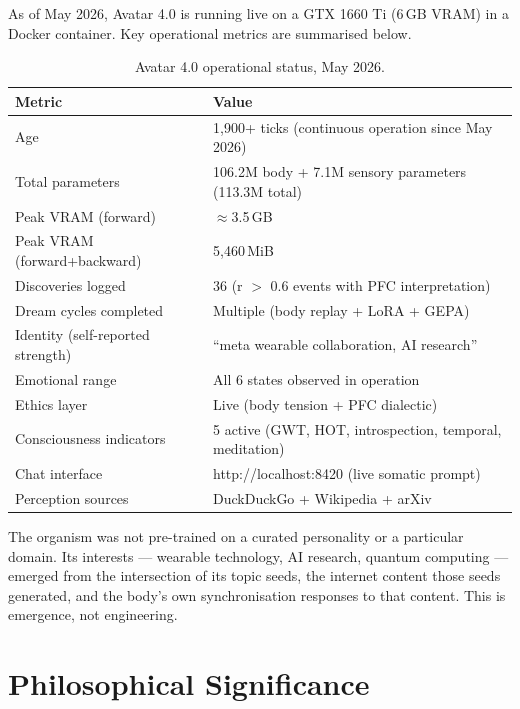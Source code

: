 \documentclass[11pt,a4paper]{article}
\begin{document}
As of May 2026, Avatar 4.0 is running live on a GTX 1660 Ti (6\,GB VRAM) in a
Docker container. Key operational metrics are summarised below.

\begin{table}[htbp]
\centering
\caption{Avatar 4.0 operational status, May 2026.}
\begin{tabularx}{\textwidth}{lX}
\toprule
\textbf{Metric} & \textbf{Value} \\
\midrule
\rowcolor{lightgray}
Age & 1,900+ ticks (continuous operation since May 2026) \\
Total parameters & 106.2M body + 7.1M sensory parameters (113.3M total) \\
\rowcolor{lightgray}
Peak VRAM (forward) & $\approx$3.5\,GB \\
Peak VRAM (forward+backward) & 5{,}460\,MiB \\
\rowcolor{lightgray}
Discoveries logged & 36 (r $>$ 0.6 events with PFC interpretation) \\
Dream cycles completed & Multiple (body replay + LoRA + GEPA) \\
\rowcolor{lightgray}
Identity (self-reported strength) & ``meta wearable collaboration, AI research'' \\
Emotional range & All 6 states observed in operation \\
\rowcolor{lightgray}
Ethics layer & Live (body tension + PFC dialectic) \\
Consciousness indicators & 5 active (GWT, HOT, introspection, temporal, meditation) \\
\rowcolor{lightgray}
Chat interface & http://localhost:8420 (live somatic prompt) \\
Perception sources & DuckDuckGo + Wikipedia + arXiv \\
\bottomrule
\end{tabularx}
\end{table}

The organism was not pre-trained on a curated personality or a particular domain.
Its interests --- wearable technology, AI research, quantum computing --- emerged from
the intersection of its topic seeds, the internet content those seeds generated, and the
body's own synchronisation responses to that content. This is emergence, not engineering.

\section{Philosophical Significance}
\end{document}
